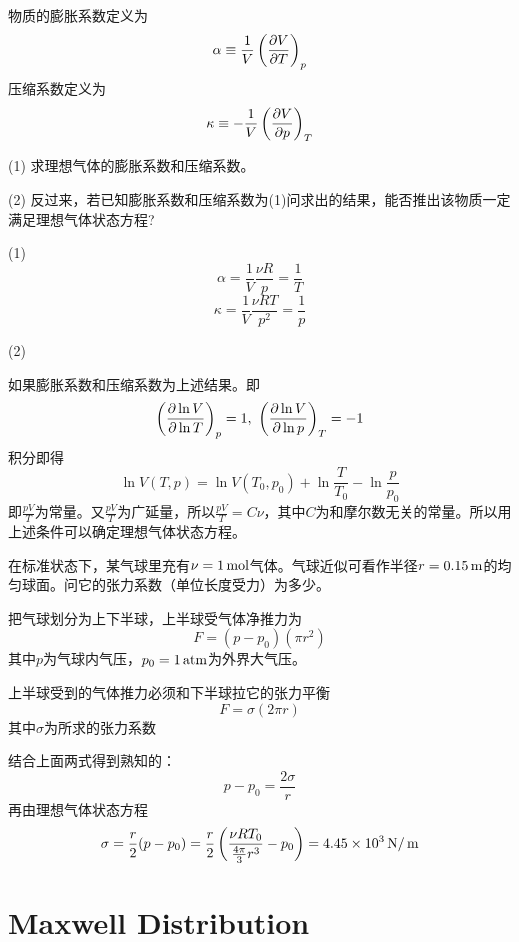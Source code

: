 \documentclass[CJK]{beamer}
\begin{document}
\begin{frame}
  \chtitle{\proid (\stwo)}
  \bch
  物质的膨胀系数定义为
  $$\alpha \equiv \frac{1}{V}\left(\frac{\partial V}{\partial T}\right)_{p} $$
  压缩系数定义为
  $$\kappa \equiv -\frac{1}{V}\left(\frac{\partial V}{\partial p}\right)_{T} $$
  \bitem
\item[(1)]{求理想气体的膨胀系数和压缩系数。}
\item[(2)]{反过来，若已知膨胀系数和压缩系数为(1)问求出的结果，能否推出该物质一定满足理想气体状态方程?}
  \eitem
  \ech
\end{frame}

\begin{frame}
  \bch
  {\small
  \bitem
\item[(1)]{$$\alpha = \frac{1}{V}\frac{\nu R}{p} = \frac{1}{T}$$
  $$\kappa = \frac{1}{V}\frac{\nu RT}{p^2} = \frac{1}{p}$$
}
\item[(2)]{如果膨胀系数和压缩系数为上述结果。即
  $$\left(\frac{\partial \ln V}{\partial \ln T}\right)_{p} = 1,\ \left(\frac{\partial \ln V}{\partial \ln p}\right)_{T} = -1$$
  积分即得
  $$ \ln V(T, p)  = \ln V(T_0, p_0) + \ln\frac{T}{T_0} - \ln\frac{p}{p_0} $$
  即$\frac{pV}{T}$为常量。又$\frac{pV}{T}$为广延量，所以$\frac{pV}{T} = C\nu$，其中$C$为和摩尔数无关的常量。所以用上述条件可以确定理想气体状态方程。
  
}  
  \eitem
  }
  \ech
\end{frame}

\begin{frame}
  \chtitle{\proid (\stwo)}
  \bch
  在标准状态下，某气球里充有$\nu=1\,\mathrm{mol}$气体。气球近似可看作半径$r=0.15\,\mathrm{m}$的均匀球面。问它的张力系数（单位长度受力）为多少。
  \ech
\end{frame}

\begin{frame}
  \bch
  {\small
  把气球划分为上下半球，上半球受气体净推力为
  $$F=(p -p_0)(\pi r^2)$$
  其中$p$为气球内气压，$p_0=1\,\mathrm{atm}$为外界大气压。

  上半球受到的气体推力必须和下半球拉它的张力平衡
  $$ F = \sigma (2\pi r)$$
  其中$\sigma$为所求的张力系数

  结合上面两式得到熟知的：
  $$ p-p_0 = \frac{2\sigma}{r} $$
  再由理想气体状态方程
  $$\sigma = \frac{r}{2}(p-p_0) = \frac{r}{2}\left(\frac{\nu R T_0}{\frac{4\pi}{3}r^3} - p_0\right) = 4.45\times 10^3 \,\mathrm{N}/\,\mathrm{m} $$

  }
  \ech
\end{frame}


\section{Maxwell Distribution}
\end{document}
